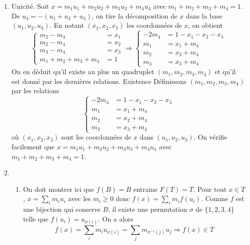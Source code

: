 \begin{enumerate}
\item Unicité.\newline
Soit $x=m_1u_1+m_2u_2+m_3u_3+m_4u_4$ avec $m_1+m_2+m_3+m_4=1$. De $u_4=-(u_1+u_2+u_3)$, on tire la décomposition de $x$ dans la base $(u_1,u_2,u_3)$. En notant $(x_1,x_2,x_3)$ les coordonnées de $x$, on obtient
\begin{displaymath}
\left\lbrace 
\begin{aligned}
 m_2-m_4 &= x_1 \\
 m_2-m_4 &= x_2 \\
 m_3-m_4 &= x_3 \\
 m_1+m_2+m_3+m_4 &= 1
\end{aligned}
\right. 
\Rightarrow
\left\lbrace 
\begin{aligned}
 -2m_4 &= 1-x_1-x_2-x_3 \\
 m_1 &= x_1 +m_4\\
 m_2 &= x_2 +m_4\\
 m_3 &= x_3 +m_4
\end{aligned}
\right. 
\end{displaymath}
On en déduit qu'il existe au plus un quadruplet $(m_1,m_2,m_3,m_4)$ et qu'il est donné par les dernières relations.\newline
Existence\newline
Définissons $(m_1,m_2,m_3,m_4)$ par les relations
\begin{displaymath}
\left\lbrace 
\begin{aligned}
 -2m_4 &= 1-x_1-x_2-x_3 \\
 m_1 &= x_1 +m_4\\
 m_2 &= x_2 +m_4\\
 m_3 &= x_3 +m_4
\end{aligned}
\right.  
\end{displaymath}
où $(x_1,x_2,x_3)$ sont les coordonnées de $x$ dans $(u_1,u_2,u_3)$. On vérifie facilement que $x=m_1u_1+m_2u_2+m_3u_3+m_4u_4$ avec $m_1+m_2+m_3+m_4=1$.
\item 
\begin{enumerate}
 \item On doit montrer ici que $f(B)=B$ entraine $F(T)=T$.\newline
Pour tout $x\in T$, $x=\sum_i m_iu_i$ avec les $m_i\geq0$ donc $f(x)=\sum_i m_if(u_i)$. Comme $f$ est une bijection qui conserve $B$, il existe une permutation $\sigma$ de $\{1,2,3,4\}$ telle que $f(u_i)=u_{\sigma(i)}$. On a alors
\begin{displaymath}
 f(x)=\sum_i m_i u_{\sigma(i)} = \sum_j m_{\sigma^{-1}(j)}u_j \Rightarrow f(x)\in T

\end{displaymath}
\end{enumerate}
\end{enumerate}
